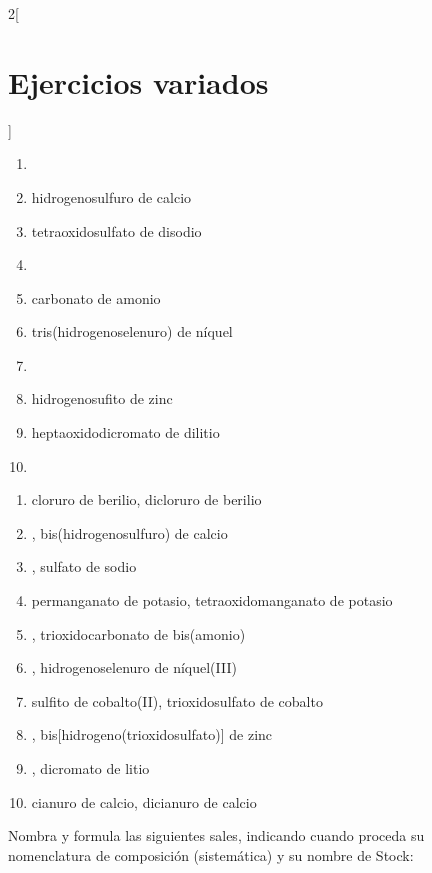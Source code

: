 \documentclass[10pt]{article}
\begin{document}
\begin{multicols*}{2}[
  \section{Ejercicios variados}
  ]
\begin{exercise}[
    tags    = {inorgánica,sales, sales binarias,sales ternarias},
    topics  = {química inorgánica,formulación,nomenclatura},
    source  = {SAN Formulación, p29, e37},
  ]
  \begin{enumerate}
    \item {}
    \item hidrogenosulfuro de calcio
    \item tetraoxidosulfato de disodio
    \item {}
    \item carbonato de amonio
    \item tris(hidrogenoselenuro) de níquel
    \item {}
    \item hidrogenosufito de zinc
    \item heptaoxidodicromato de dilitio
    \item {}
  \end{enumerate}
\end{exercise}

\begin{solution}
  \begin{enumerate}
    \item cloruro de berilio, dicloruro de berilio
    \item {}, bis(hidrogenosulfuro) de calcio
    \item {}, sulfato de sodio
    \item permanganato de potasio, tetraoxidomanganato de potasio
    \item {}, trioxidocarbonato de bis(amonio)
    \item {}, hidrogenoselenuro de níquel(III)
    \item sulfito de cobalto(II), trioxidosulfato de cobalto
    \item {}, bis[hidrogeno(trioxidosulfato)] de zinc
    \item {}, dicromato de litio
    \item cianuro de calcio, dicianuro de calcio
  \end{enumerate}
\end{solution}




\begin{exercise}[
    tags    = {inorgánica,sales, sales binarias,sales ternarias},
    topics  = {química inorgánica,formulación,nomenclatura},
    source  = {SAN Formulación, p29, e38},
  ]
  Nombra y formula las siguientes sales, indicando cuando proceda su nomenclatura de composición (sistemática) y su nombre de Stock:


\end{exercise}
\end{multicols*}
\end{document}
